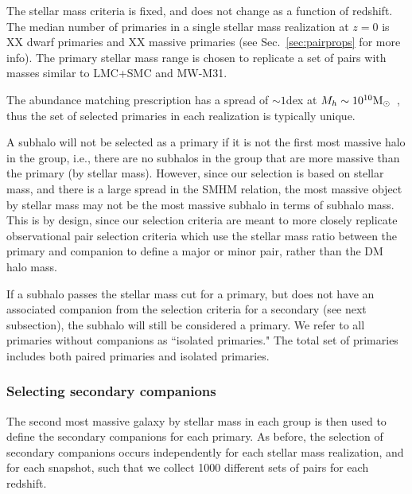 \documentclass[twocolumn]{aastex631}
\begin{document}
        The stellar mass criteria is fixed, and does not change as a function of redshift. 
        The median number of primaries in a single stellar mass realization at $z=0$ is XX dwarf primaries and XX massive primaries (see Sec.~\ref{sec:pairprops} for more info). 
        The primary stellar mass range is chosen to replicate a set of pairs with masses similar to LMC+SMC and MW-M31. 
        
        The abundance matching prescription has a spread of $\sim 1$dex at $M_{h}\sim 10^{10}\mathrm{M}_\odot$~\citep{Moster2013}, thus the set of selected primaries in each realization is typically unique. 
    
        A subhalo will not be selected as a primary if it is not the first most massive halo in the group, i.e., there are no subhalos in the group that are more massive than the primary (by stellar mass). However, since our selection is based on stellar mass, and there is a large spread in the SMHM relation, the most massive object by stellar mass may not be the most massive subhalo in terms of subhalo mass. 
        This is by design, since our selection criteria are meant to more closely replicate observational pair selection criteria which use the stellar mass ratio between the primary and companion to define a major or minor pair, rather than the DM halo mass. 
    
        If a subhalo passes the stellar mass cut for a primary, but does not have an associated companion from the selection criteria for a secondary (see next subsection), the subhalo will still be considered a primary. We refer to all primaries without companions as ``isolated primaries."
        The total set of primaries includes both paired primaries and isolated primaries.
    
    \subsubsection{Selecting secondary companions}
        The second most massive galaxy by stellar mass in each group is then used to define the secondary companions for each primary. 
        As before, the selection of secondary companions occurs independently for each stellar mass realization, and for each snapshot, such that we collect 1000 different sets of pairs for each redshift.
        
\end{document}
